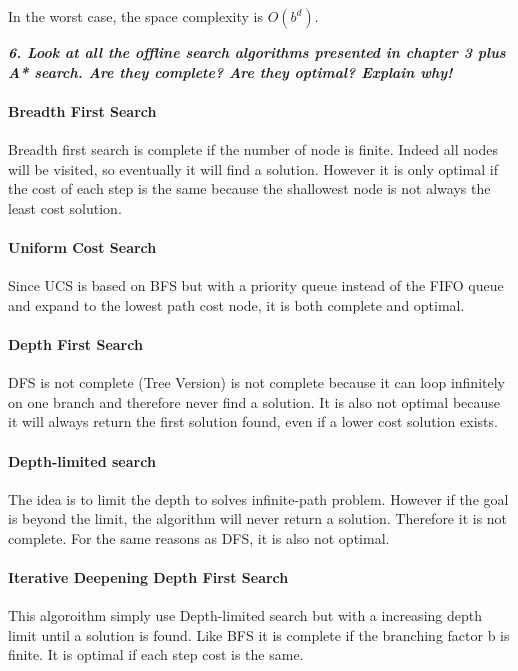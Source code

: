 In the worst case, the space complexity is $O(b^d)$.
\newpage

\textit{\textbf{6. Look at all the offline search algorithms presented in chapter 3 plus A* search.
Are they complete? Are they optimal? Explain why!}}

\paragraph{Breadth First Search}

Breadth first search is complete if the number of node is finite. Indeed all nodes
will be visited, so eventually it will find a solution. However it is only optimal
if the cost of each step is the same because the shallowest node is not always
the least cost solution.

\paragraph{Uniform Cost Search}

Since UCS is based on BFS but with a priority queue instead of the FIFO queue and
expand to the lowest path cost node, it is both complete and optimal.

\paragraph{Depth First Search}

DFS is not complete (Tree Version) is not complete because it can loop infinitely
on one branch and therefore never find a solution. It is also not optimal because it
will always return the first solution found, even if a lower cost solution exists.

\paragraph{Depth-limited search}

The idea is to limit the depth to solves infinite-path problem. However if the goal
is beyond the limit, the algorithm will never return a solution. Therefore it is
not complete.
For the same reasons as DFS, it is also not optimal.

\paragraph{Iterative Deepening Depth First Search}

This algoroithm simply use Depth-limited search but with a increasing depth limit
until a solution is found. Like BFS it is complete if the branching factor b is
finite. It is optimal if each step cost is the same.

